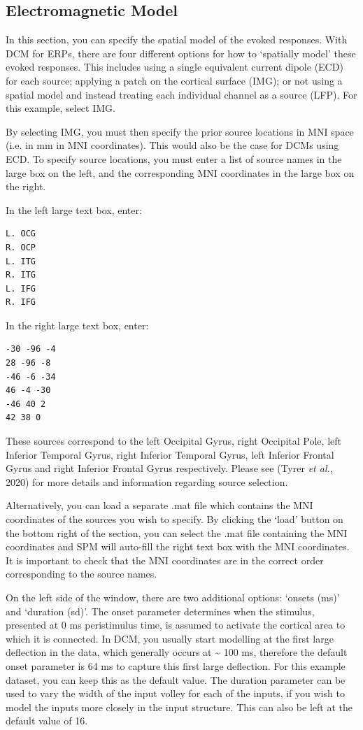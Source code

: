 \subsection{Electromagnetic Model}

In this section, you can specify the spatial model of the evoked
responses. With DCM for ERPs, there are four different options for how
to `spatially model' these evoked responses. This includes using a
single equivalent current dipole (ECD) for each source; applying a patch
on the cortical surface (IMG); or not using a spatial model and instead
treating each individual channel as a source (LFP). For this example,
select IMG.

By selecting IMG, you must then specify the prior source locations in
MNI space (i.e. in mm in MNI coordinates). This would also be the case
for DCMs using ECD. To specify source locations, you must enter a list
of source names in the large box on the left, and the corresponding MNI
coordinates in the large box on the right.

In the left large text box, enter:

\begin{verbatim}
L. OCG
R. OCP
L. ITG
R. ITG
L. IFG
R. IFG
\end{verbatim}

In the right large text box, enter:

\begin{verbatim}
-30 -96 -4
28 -96 -8
-46 -6 -34
46 -4 -30
-46 40 2
42 38 0
\end{verbatim}

These sources correspond to the left Occipital Gyrus, right Occipital
Pole, left Inferior Temporal Gyrus, right Inferior Temporal Gyrus, left
Inferior Frontal Gyrus and right Inferior Frontal Gyrus respectively.
Please see (Tyrer \emph{et al.}, 2020) for more details and information
regarding source selection.

Alternatively, you can load a separate .mat file which contains the MNI
coordinates of the sources you wish to specify. By clicking the `load'
button on the bottom right of the section, you can select the .mat file
containing the MNI coordinates and SPM will auto-fill the right text box
with the MNI coordinates. It is important to check that the MNI
coordinates are in the correct order corresponding to the source names.

On the left side of the window, there are two additional options:
`onsets (ms)' and `duration (sd)'. The onset parameter determines when
the stimulus, presented at 0 ms peristimulus time, is assumed to
activate the cortical area to which it is connected. In DCM, you usually
start modelling at the first large deflection in the data, which
generally occurs at \textasciitilde{} 100 ms, therefore the default
onset parameter is 64 ms to capture this first large deflection. For
this example dataset, you can keep this as the default value. The
duration parameter can be used to vary the width of the input volley for
each of the inputs, if you wish to model the inputs more closely in the
input structure. This can also be left at the default value of 16.

